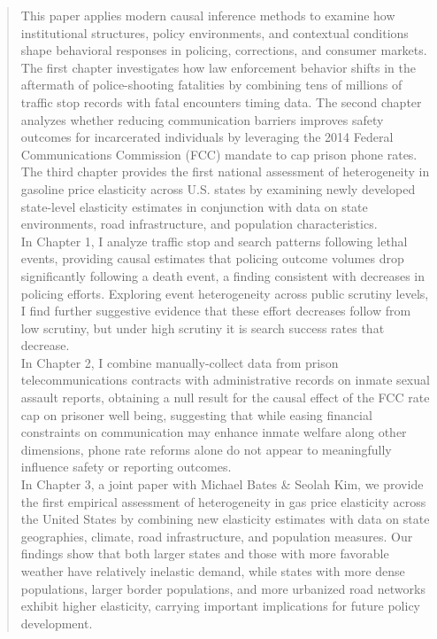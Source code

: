 \begin{abstract}

This paper applies modern causal inference methods to examine how institutional structures, policy environments, and contextual conditions shape behavioral responses in policing, corrections, and consumer markets. The first chapter investigates how law enforcement behavior shifts in the aftermath of police-shooting fatalities by combining tens of millions of traffic stop records with fatal encounters timing data. The second chapter analyzes whether reducing communication barriers improves safety outcomes for incarcerated individuals by leveraging the 2014 Federal Communications Commission (FCC) mandate to cap prison phone rates. The third chapter provides the first national assessment of heterogeneity in gasoline price elasticity across U.S. states by examining newly developed state-level elasticity estimates in conjunction with data on state environments, road infrastructure, and population characteristics. \\

In Chapter 1, I analyze traffic stop and search patterns following lethal events, providing causal estimates that policing outcome volumes drop significantly following a death event, a finding consistent with decreases in policing efforts. Exploring event heterogeneity across public scrutiny levels, I find further suggestive evidence that these effort decreases follow from low scrutiny, but under high scrutiny it is search success rates that decrease. \\

In Chapter 2, I combine manually-collect data from prison telecommunications contracts with administrative records on inmate sexual assault reports, obtaining a null result for the causal effect of the FCC rate cap on prisoner well being, suggesting that while easing financial constraints on communication may enhance inmate welfare along other dimensions, phone rate reforms alone do not appear to meaningfully influence safety or reporting outcomes. \\

In Chapter 3, a joint paper with Michael Bates \& Seolah Kim, we provide the first empirical assessment of heterogeneity in gas price elasticity across the United States by combining new elasticity estimates with data on state geographies, climate, road infrastructure, and population measures. Our findings show that both larger states and those with more favorable weather have relatively inelastic demand, while states with more dense populations, larger border populations, and more urbanized road networks exhibit higher elasticity, carrying important implications for future policy development. 

\end{abstract}